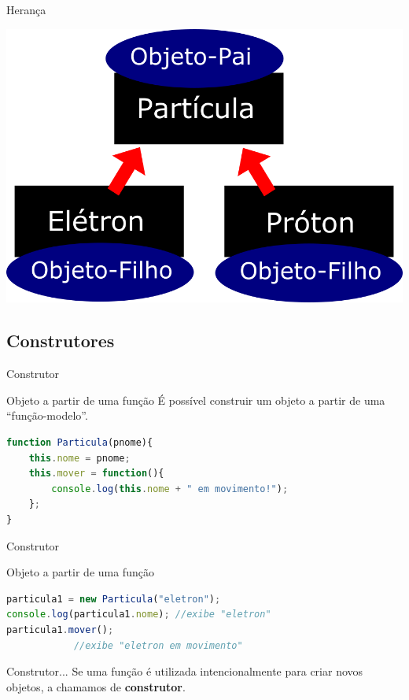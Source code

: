 \documentclass[xcolor=dvipsnames,table]{beamer}
\begin{document}
\begin{frame}{Herança}
	\begin{center}
		\includegraphics[scale=0.3]{images/heranca03.png}
	\end{center}
\end{frame}

\subsection{Construtores}
\begin{frame}[fragile]{Construtor}
	\begin{block}{Objeto a partir de uma função}
		É possível construir um objeto a partir de uma ``função-modelo''.
		\begin{lstlisting}[language=JavaScript]
function Particula(pnome){
	this.nome = pnome;
	this.mover = function(){
		console.log(this.nome + " em movimento!");
	};
}
\end{lstlisting}	
	\end{block}
\end{frame}

\begin{frame}[fragile]{Construtor}
	\begin{block}{Objeto a partir de uma função}
		\begin{lstlisting}[language=JavaScript]
particula1 = new Particula("eletron");
console.log(particula1.nome); //exibe "eletron"
particula1.mover();	
			//exibe "eletron em movimento"
\end{lstlisting}	
	\end{block} \pause
	\begin{block}{Construtor...}
		Se uma função é utilizada intencionalmente para criar novos objetos, a chamamos de {\bf construtor}.
	\end{block}
\end{frame}
\end{document}
